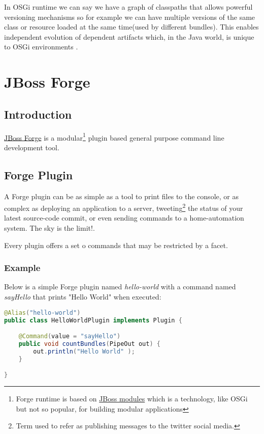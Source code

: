 In OSGi runtime we can say we have a graph of classpaths that allows powerful versioning mechanisms so for example we can have multiple versions of the same class or resource loaded at the same time(used by different bundles). This enables independent evolution of dependent artifacts which, in the Java world, is unique to OSGi environments \citep{semantic versioning 2010}.   

\section{JBoss Forge}
\label{sec:forge}
\subsection{Introduction}
\href{http://forge.jboss.org/1.x/}{JBoss Forge} is a modular\footnote{Forge runtime is based on \href{https://docs.jboss.org/author/display/MODULES/Introduction}{JBoss modules} which is a technology, like OSGi but not so popular, for building modular applications} plugin based general purpose command line development tool. 

\subsection{Forge Plugin}
\label{sec:forge:plugin}
A Forge plugin can be as simple as a tool to print files to the console, or as complex as deploying an application to a server, tweeting\footnote{Term used to refer as publishing messages to the twitter social media.} the status of your latest source-code commit, or even sending commands to a home-automation system. The sky is the limit!. 

Every plugin offers a set o commands that may be restricted by a facet.

\subsubsection{Example}
Below is a simple Forge plugin named \emph{hello-world} with a command named \emph{sayHello} that prints "Hello World" when executed:

\begin{lstlisting}[language=java,label=forge-plugin,caption=Forge plugin example]
@Alias("hello-world")
public class HelloWorldPlugin implements Plugin {

    @Command(value = "sayHello")
    public void countBundles(PipeOut out) {
        out.println("Hello World" );
    }

}
\end{lstlisting}

